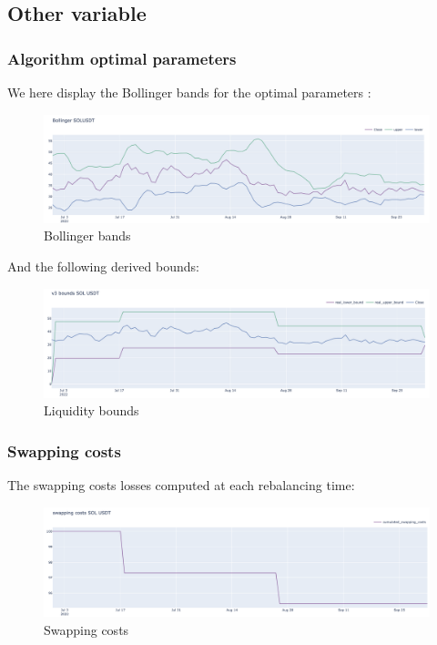 \documentclass[conference]{IEEEtran}
\begin{document}
\subsection{Other variable}
\subsubsection{Algorithm optimal parameters}
We here display the Bollinger bands for the optimal parameters :
\begin{figure}[h!]
    \centering
    \includegraphics[scale=0.2]{Plots/bollinger.png}
    \caption{Bollinger bands}
    \label{fig:conc_liquidity}
\end{figure}
And the following derived bounds:
\begin{figure}[h!]
    \centering
    \includegraphics[scale=0.2]{Plots/bounds_over_time.png}
    \caption{Liquidity bounds}
    \label{fig:conc_liquidity}
\end{figure}
\subsubsection{Swapping costs}
The swapping costs losses computed at each rebalancing time:
\begin{figure}[h!]
    \centering
    \includegraphics[scale=0.2]{Plots/swapping_cost.png}
    \caption{Swapping costs}
    \label{fig:conc_liquidity}
\end{figure}
\end{document}
